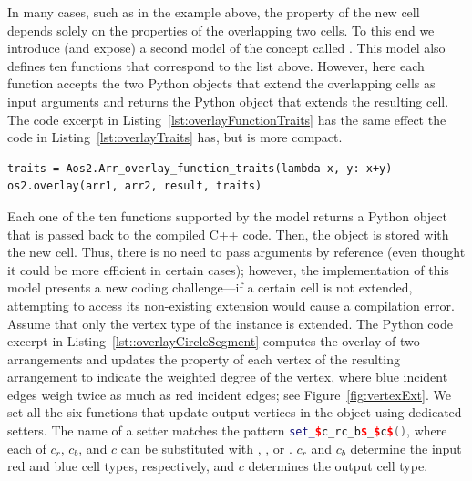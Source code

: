 In many cases, such as in the example above, the property of the new cell depends solely on the properties of the overlapping two cells. To this end we introduce (and expose) a second model of the  concept called . This model also defines ten functions that correspond to the list above. However, here each function accepts the two Python objects that extend the overlapping cells as input arguments and returns the Python object that extends the resulting cell. The code excerpt in Listing~\ref{lst:overlayFunctionTraits} has the same effect the code in Listing~\ref{lst:overlayTraits} has, but is more compact.

\begin{lstfloat}
\begin{lstlisting}[style=pythonFramedStyle,basicstyle=\scriptsize,label={lst:overlayFunctionTraits},caption={Computing the map overlay of two arrangements using the functional overlay traits.}]
traits = Aos2.Arr_overlay_function_traits(lambda x, y: x+y)
os2.overlay(arr1, arr2, result, traits)
\end{lstlisting}
\end{lstfloat}

Each one of the ten functions supported by the  model returns a Python object that is passed back to the compiled C++ code. Then, the object is stored with the new cell. Thus, there is no need to pass arguments by reference (even thought it could be more efficient in certain cases); however, the implementation of this model presents a new coding challenge---if a certain cell is not extended, attempting to access its non-existing extension would cause a compilation error.
%
Assume that only the vertex type of the  instance is extended. The Python code excerpt in Listing~\ref{lst::overlayCircleSegment} computes the overlay of two arrangements and updates the property of each vertex of the resulting arrangement to indicate the weighted degree of the vertex, where blue incident edges weigh twice as much as red incident edges; see Figure~\ref{fig:vertexExt}. We set all the six functions that update output vertices in the  object using dedicated setters. The name of a setter matches the pattern \lstinline[language={C++},mathescape=true,columns=fixed]{set_$c_rc_b$_$c$()}, where each of $c_r$, $c_b$, and $c$ can be substituted with , , or . $c_r$ and $c_b$ determine the input red and blue cell types, respectively, and $c$ determines the output cell type.


